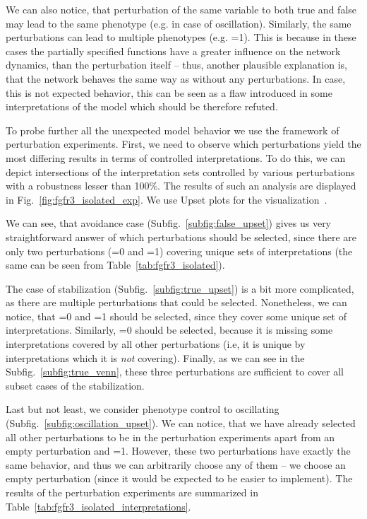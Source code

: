 We can also notice, that perturbation of the same variable to both true and false may lead to the same phenotype (e.g.  in case of oscillation). Similarly, the same perturbations can lead to multiple phenotypes (e.g. =1). This is because in these cases the partially specified functions have a greater influence on the network dynamics, than the perturbation itself -- thus, another plausible explanation is, that the network behaves the same way as without any perturbations. In case, this is not expected behavior, this can be seen as a flaw introduced in some interpretations of the model which should be therefore refuted.

To probe further all the unexpected model behavior we use the framework of perturbation experiments. First, we need to observe which perturbations yield the most differing results in terms of controlled interpretations. To do this, we can depict intersections of the interpretation sets controlled by various perturbations with a robustness lesser than 100\%. The results of such an analysis are displayed in Fig.~\ref{fig:fgfr3_isolated_exp}. We use Upset plots for the visualization~\cite{Lex2014}.

We can see, that  avoidance case (Subfig.~\ref{subfig:false_upset}) gives us very straightforward answer of which perturbations should be selected, since there are only two perturbations (=0 and =1) covering unique sets of interpretations (the same can be seen from Table~\ref{tab:fgfr3_isolated}). 

The case of  stabilization (Subfig.~\ref{subfig:true_upset}) is a bit more complicated, as there are multiple perturbations that could be selected. Nonetheless, we can notice, that =0 and =1 should be selected, since they cover some unique set of interpretations. Similarly, =0 should be selected, because it is missing some interpretations covered by all other perturbations (i.e, it is unique by interpretations which it is \emph{not} covering). Finally, as we can see in the Subfig.~\ref{subfig:true_venn}, these three perturbations are sufficient to cover all subset cases of the  stabilization.

Last but not least, we consider phenotype control to oscillating  (Subfig.~\ref{subfig:oscillation_upset}). We can notice, that we have already selected all other perturbations to be in the perturbation experiments apart from an empty perturbation and =1. However, these two perturbations have exactly the same behavior, and thus we can arbitrarily choose any of them -- we choose an empty perturbation (since it would be expected to be easier to implement). The results of the perturbation experiments are summarized in Table~\ref{tab:fgfr3_isolated_interpretations}.

